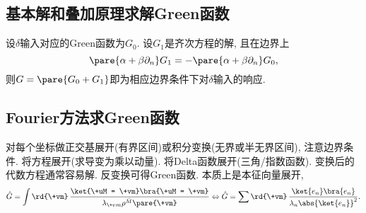 \documentclass[hidelinks]{ctexart}
\begin{document}

\subsection{基本解和叠加原理求解Green函数} %
\label{sub:基本解和叠加原理求解green函数}

\newpoint{}设$\delta$输入对应的Green函数为$G_0$.
\newpoint{}设$G_1$是齐次方程的解, 且在边界上
\[ \pare{\alpha + \beta \partial_n} G_1 = -\pare{\alpha + \beta \partial_n} G_0, \]
则$G = \pare{G_0 + G_1}$即为相应边界条件下对$\delta$输入的响应.


\subsection{Fourier方法求Green函数} %
\label{sub:fourier方法求green函数}

\newpoint{}对每个坐标做正交基展开(有界区间)或积分变换(无界或半无界区间), 注意边界条件.
\newpoint{}将方程展开(求导变为乘以动量).
\newpoint{}将Delta函数展开(三角/指数函数).
\newpoint{}变换后的代数方程通常容易解.
\newpoint{}反变换可得Green函数.
\newpoint{}本质上是本征向量展开,
\[ \hat G = \int \rd{\+vm}\, \frac{\ket{\+uM = \+vm}\bra{\+uM = \+vm}}{\lambda_{\+vm}\rho^{\hat M}\pare{\+vm}} \Leftrightarrow \hat G = \sum \rd{\+vm}\, \frac{\ket{e_n}\bra{e_n}}{\lambda_n \abs{\ket{e_n}}^2}. \]
\end{document}
